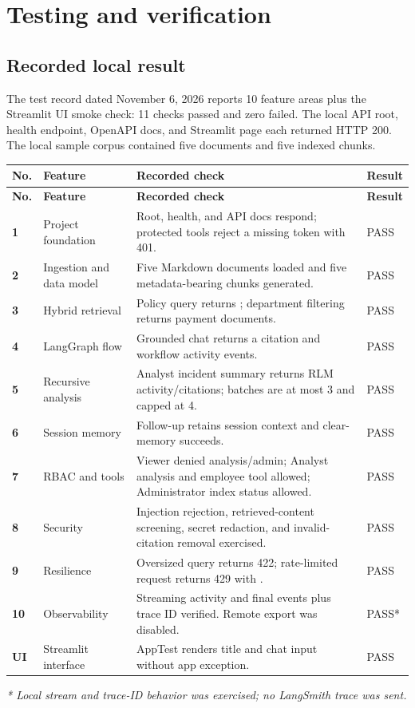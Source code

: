 \documentclass[11pt,a4paper,oneside]{report}
\newcommand{\code}[1]{\texttt{\detokenize{#1}}}
\begin{document}
\chapter{Testing and verification}

\section{Recorded local result}
The test record dated November 6, 2026 reports 10 feature areas plus the Streamlit UI smoke check: 11 checks passed and zero failed. The local API root, health endpoint, OpenAPI docs, and Streamlit page each returned HTTP 200. The local sample corpus contained five documents and five indexed chunks.

{\setlength{\tabcolsep}{3pt}
\begin{longtable}{@{}>{\bfseries}L{6mm}L{32mm}L{92mm}L{12mm}@{}}
\toprule
\textbf{No.} & \textbf{Feature} & \textbf{Recorded check} & \textbf{Result} \\
\midrule
\endfirsthead
\toprule
\textbf{No.} & \textbf{Feature} & \textbf{Recorded check} & \textbf{Result} \\
\midrule
{} & Project foundation & Root, health, and API docs respond; protected tools reject a missing token with 401. & PASS \\
2 & Ingestion and data model & Five Markdown documents loaded and five metadata-bearing chunks generated. & PASS \\
3 & Hybrid retrieval & Policy query returns \code{POL-SEC-003}; department filtering returns payment documents. & PASS \\
4 & LangGraph flow & Grounded chat returns a citation and workflow activity events. & PASS \\
5 & Recursive analysis & Analyst incident summary returns RLM activity/citations; batches are at most 3 and capped at 4. & PASS \\
6 & Session memory & Follow-up retains session context and clear-memory succeeds. & PASS \\
7 & RBAC and tools & Viewer denied analysis/admin; Analyst analysis and employee tool allowed; Administrator index status allowed. & PASS \\
8 & Security & Injection rejection, retrieved-content screening, secret redaction, and invalid-citation removal exercised. & PASS \\
9 & Resilience & Oversized query returns 422; rate-limited request returns 429 with \code{Retry-After}. & PASS \\
10 & Observability & Streaming activity and final events plus trace ID verified. Remote export was disabled. & PASS* \\
UI & Streamlit interface & AppTest renders title and chat input without app exception. & PASS \\
\bottomrule
\end{longtable}
}
\textit{* Local stream and trace-ID behavior was exercised; no LangSmith trace was sent.}
\end{document}
